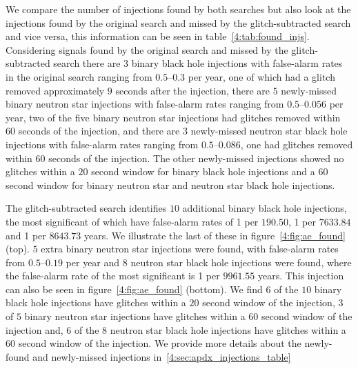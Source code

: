 We compare the number of injections found by both searches but also look at the \gw{} injections found by the original search and missed by the glitch-subtracted search and vice versa, this information can be seen in table~\ref{4:tab:found_injs}. Considering signals found by the original search and missed by the glitch-subtracted search there are $3$ binary black hole injections with false-alarm rates in the original search ranging from $0.5\text{--}0.3$ per year, one of which had a glitch removed approximately $9$ seconds after the injection, there are $5$ newly-missed binary neutron star injections with false-alarm rates ranging from $0.5\text{--}0.056$ per year, two of the five binary neutron star injections had glitches removed within $60$ seconds of the injection, and there are $3$ newly-missed neutron star black hole injections with false-alarm rates ranging from $0.5\text{--}0.086$, one had glitches removed within $60$ seconds of the injection. The other newly-missed injections showed no \scl{} glitches within a $20$ second window for binary black hole injections and a $60$ second window for binary neutron star and neutron star black hole injections.

The glitch-subtracted search identifies $10$ additional binary black hole injections, the most significant of which have false-alarm rates of 1 per $190.50$, 1 per $7633.84$ and 1 per $8643.73$ years. We illustrate the last of these in figure~\ref{4:fig:ae_found} (top). $5$ extra binary neutron star injections were found, with false-alarm rates from $0.5\text{--}0.19$ per year and $8$ neutron star black hole injections were found, where the false-alarm rate of the most significant is 1 per $9961.55$ years. This injection can also be seen in figure~\ref{4:fig:ae_found} (bottom). We find $6$ of the $10$ binary black hole injections have \scl{} glitches within a $20$ second window of the injection, $3$ of $5$ binary neutron star injections have \scl{} glitches within a $60$ second window of the injection and, $6$ of the $8$ neutron star black hole injections have \scl{} glitches within a $60$ second window of the injection. We provide more details about the newly-found and newly-missed injections in~\ref{4:sec:apdx_injections_table}

